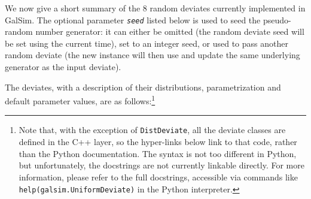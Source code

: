 \documentclass[preprint,10pt]{../../devel/modules/aastex}
\begin{document}
We now give a short summary of the 8 random deviates currently
implemented in GalSim.   The optional parameter \emph{\texttt{seed}}
listed below is used
to seed the pseudo-random number generator: it can
either be omitted (the random deviate seed will be set using the
current time), set to an integer seed, or used to pass another random
deviate (the new instance will then use and update the same underlying
generator as the input deviate).

The deviates, with a description of their distributions, parametrization and
default parameter values, are as follows:\footnote{
Note that, with the exception of \texttt{DistDeviate},
all the deviate classes are defined in the C++ layer, so the hyper-links
below link to that code, rather than the Python documentation.  The
syntax is not too different in Python, but unfortunately, the docstrings
are not currently linkable directly.
For more information, please refer to the full docstrings, accessible
via commands like \texttt{help(galsim.UniformDeviate)} in the Python interpreter.}
\end{document}
